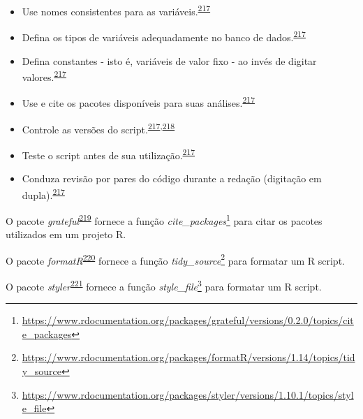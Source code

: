 \documentclass[
  a4paper,
]{book}
\renewcommand{\href}[2]{#2\footnote{\url{#1}}}
\newenvironment{infobox}[1]
  {
  \begin{itemize}
  \renewcommand{\labelitemi}{
    \raisebox{-.7\height}[0pt][0pt]{
      {\setkeys{Gin}{width=3em,keepaspectratio}
        \texttt{[image: \#1]}}
    }
  }
  \setlength{\fboxsep}{1em}
  \begin{blackbox}
  \item
  }
  {
  \end{blackbox}
  \end{itemize}
  }
\begin{document}
\begin{itemize}
\item
  Use nomes consistentes para as variáveis.\textsuperscript{\protect\hyperlink{ref-SchwabSimon2021}{217}}
\item
  Defina os tipos de variáveis adequadamente no banco de dados.\textsuperscript{\protect\hyperlink{ref-SchwabSimon2021}{217}}
\item
  Defina constantes - isto é, variáveis de valor fixo - ao invés de digitar valores.\textsuperscript{\protect\hyperlink{ref-SchwabSimon2021}{217}}
\item
  Use e cite os pacotes disponíveis para suas análises.\textsuperscript{\protect\hyperlink{ref-SchwabSimon2021}{217}}
\item
  Controle as versões do script.\textsuperscript{\protect\hyperlink{ref-SchwabSimon2021}{217},\protect\hyperlink{ref-Eglen2017}{218}}
\item
  Teste o script antes de sua utilização.\textsuperscript{\protect\hyperlink{ref-SchwabSimon2021}{217}}
\item
  Conduza revisão por pares do código durante a redação (digitação em dupla).\textsuperscript{\protect\hyperlink{ref-SchwabSimon2021}{217}}
\end{itemize}

\begin{infobox}{images/Rlogo}
O pacote \emph{grateful}\textsuperscript{\protect\hyperlink{ref-grateful}{219}} fornece a função \href{https://www.rdocumentation.org/packages/grateful/versions/0.2.0/topics/cite_packages}{\emph{cite\_packages}} para citar os pacotes utilizados em um projeto R.

\end{infobox}

\begin{infobox}{images/Rlogo}
O pacote \emph{formatR}\textsuperscript{\protect\hyperlink{ref-formatR}{220}} fornece a função \href{https://www.rdocumentation.org/packages/formatR/versions/1.14/topics/tidy_source}{\emph{tidy\_source}} para formatar um R script.

\end{infobox}

\begin{infobox}{images/Rlogo}
O pacote \emph{styler}\textsuperscript{\protect\hyperlink{ref-styler}{221}} fornece a função \href{https://www.rdocumentation.org/packages/styler/versions/1.10.1/topics/style_file}{\emph{style\_file}} para formatar um R script.

\end{infobox}
\end{document}
